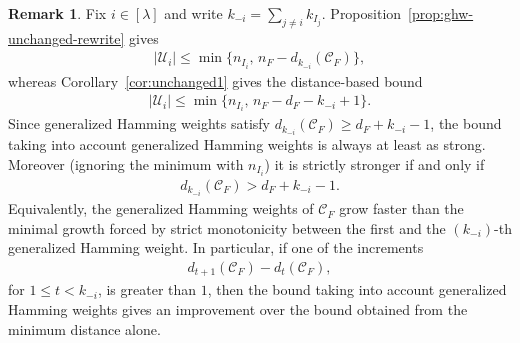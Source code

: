 \documentclass[conference, 10pt]{IEEEtran}
\theoremstyle{plain}
\theoremstyle{definition}
\newtheorem{remark}[definition]{Remark}
\newcommand{\mC}{\mathcal{C}}
\newcommand{\mU}{\mathcal{U}}
\begin{document}
\begin{remark}\label{rem:write-ghw-improvement}
Fix $i\in [\lambda]$ and write $k_{-i}=\sum_{j\ne i}k_{I_j}$. Proposition~\ref{prop:ghw-unchanged-rewrite} gives
\begin{align*}
    |\mU_i|\le \min\{n_{I_i},\,n_F-d_{k_{-i}}(\mC_F)\},
\end{align*}
whereas Corollary~\ref{cor:unchanged1} gives the distance-based bound
\begin{align*}
    |\mU_i|\le \min\{n_{I_i},\,n_F-d_F-k_{-i}+1\}.
\end{align*}
Since generalized Hamming weights satisfy $d_{k_{-i}}(\mC_F)\ge d_F+k_{-i}-1$, the bound taking into account generalized Hamming weights is always at least as strong. Moreover (ignoring the minimum with $n_{I_i}$) it is strictly stronger if and only if
\begin{align*}
    d_{k_{-i}}(\mC_F)>d_F+k_{-i}-1.
\end{align*}
Equivalently, the generalized Hamming weights of $\mC_F$ grow faster than the minimal growth forced by strict monotonicity between the first and the $(k_{-i})$-th generalized Hamming weight. In particular, if one of the increments
\begin{align*}
    d_{t+1}(\mC_F)-d_t(\mC_F),
\end{align*}
for $1\le t<k_{-i}$, is greater than $1$, then the bound taking into account generalized Hamming weights gives an improvement over the bound obtained from the minimum distance alone.
\end{remark}
\end{document}
